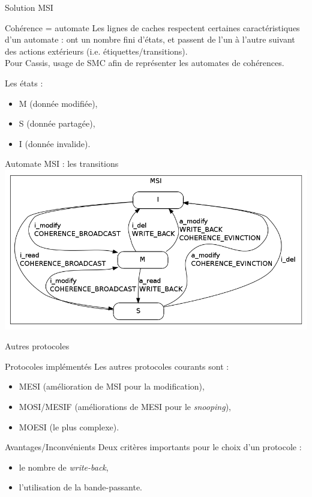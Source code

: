 \begin{frame}{Solution MSI}
  \begin{block}{Cohérence = automate}
    Les lignes de caches respectent certaines caractéristiques d'un automate : ont un nombre fini d'états, et passent de l'un à l'autre suivant des actions extérieurs (i.e. étiquettes/transitions).\\
    Pour \textsf{Cassis}, usage de \textsf{SMC} afin de représenter les automates de cohérences.
  \end{block}
  
  \begin{block}{Les états :}
    \begin{itemize}
    \item{M (donnée modifiée),}
    \item{S (donnée partagée),}
    \item{I (donnée invalide).}
    \end{itemize}
  \end{block}
\end{frame}

\begin{frame}{Automate MSI : les transitions}
    \includegraphics[scale=.4]{images/MSI_simple.png}
\end{frame}

\begin{frame}{Autres protocoles}
  \begin{block}{Protocoles implémentés}
    Les autres protocoles courants sont :
    \begin{itemize}
    \item{MESI (amélioration de MSI pour la modification),}
    \item{MOSI/MESIF (améliorations de MESI pour le \emph{snooping}),}
    \item{MOESI (le plus complexe).}
    \end{itemize}
  \end{block}
  
  \begin{block}{Avantages/Inconvénients}
    Deux critères importants pour le choix d'un protocole :
    \begin{itemize}
    \item{le nombre de \emph{write-back},}
    \item{l'utilisation de la bande-passante.}
    \end{itemize}
  \end{block}
\end{frame}

